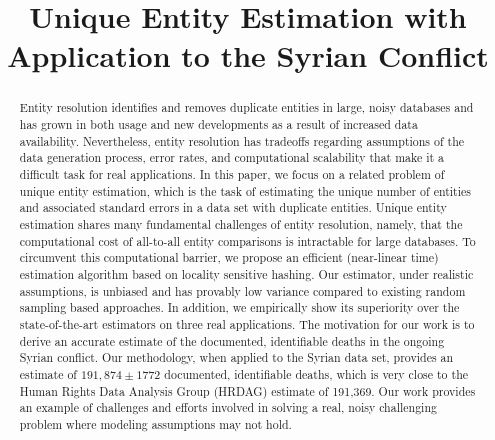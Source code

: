 \documentclass{imsart}
\begin{document}
\begin{frontmatter}
\title{ Unique Entity Estimation with Application to the Syrian Conflict}





\begin{abstract}
Entity resolution identifies and removes duplicate entities in large, noisy databases and has grown in both usage and new developments as a result of increased data availability. Nevertheless, entity resolution has tradeoffs regarding assumptions of the data generation process, error rates, and computational scalability that make it a difficult task for real applications. In this paper, we focus on a related problem of unique entity estimation, which is the task of estimating the unique number of entities and associated standard errors in a data set with duplicate entities. Unique entity estimation shares many fundamental challenges of entity resolution, namely, that the computational cost of all-to-all entity comparisons is intractable for large databases. To circumvent this computational barrier, we propose an efficient (near-linear time) estimation algorithm based on locality sensitive hashing. Our estimator, under realistic assumptions, is unbiased and has provably low variance compared to existing random sampling based approaches. In addition, we empirically show its superiority over the state-of-the-art estimators on three real applications. The motivation for our work is to derive an accurate estimate of the documented, identifiable deaths in the ongoing Syrian conflict. Our methodology, when applied to the Syrian data set, provides an estimate of $191,874 \pm 1772$ documented, identifiable deaths, which is very close to the Human Rights Data Analysis Group (HRDAG) estimate of 191,369. Our work provides an example of challenges and efforts involved in solving a real, noisy challenging problem where modeling assumptions may not hold.
\end{abstract}



\end{frontmatter}
\end{document}
